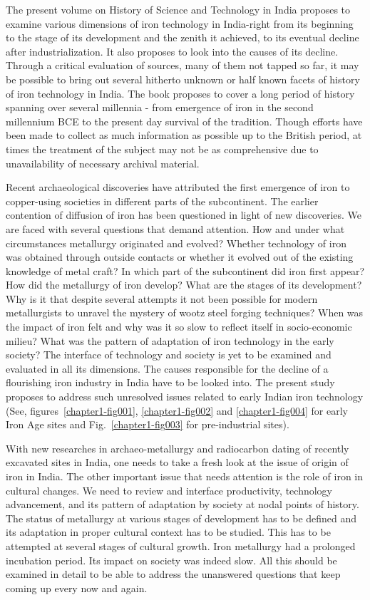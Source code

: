 The present volume on History of Science and Technology in India proposes to examine various dimensions of iron technology in India-right from its beginning to the stage of its development and the zenith it achieved, to its eventual decline after industrialization. It also proposes to look into the causes of its decline. Through a critical evaluation of sources, many of them not tapped so far, it may be possible to bring out several hitherto unknown or half known facets of history of iron technology in India. The book proposes to cover a long period of history spanning over several millennia - from emergence of iron in the second millennium BCE to the present day survival of the tradition. Though efforts have been made to collect as much information as possible up to the British period, at times the treatment of the subject may not be as comprehensive due to unavailability of necessary archival material.

Recent archaeological discoveries have attributed the first emergence of iron to copper-using societies in different parts of the subcontinent. The earlier contention of diffusion of iron has been questioned in light of new discoveries. We are faced with several questions that demand attention. How and under what circumstances metallurgy originated and evolved? Whether technology of iron was obtained through outside contacts or whether it evolved out of the existing knowledge of metal craft? In which part of the subcontinent did iron first appear? How did the metallurgy of iron develop? What are the stages of its development? Why is it that despite several attempts it not been possible for modern metallurgists to unravel the mystery of wootz steel forging techniques? When was the impact of iron felt and why was it so slow to reflect itself in socio-economic milieu? What was the pattern of adaptation of iron technology in the early society? The interface of technology and society is yet to be examined and evaluated in all its dimensions. The causes responsible for the decline of a flourishing iron industry in India have to be looked into. The present study proposes to address such unresolved issues related to early Indian iron technology (See, figures~{\ref{chapter1-fig001}}, \ref{chapter1-fig002} and \ref{chapter1-fig004} for early Iron Age sites and Fig.~\ref{chapter1-fig003} for pre-industrial sites). 

\newpage

With new researches in archaeo-metallurgy and radiocarbon dating of recently excavated sites in India, one needs to take a fresh look at the issue of origin of iron in India. The other important issue that needs attention is the role of iron in cultural changes. We need to review and interface productivity, technology advancement, and its pattern of adaptation by society at nodal points of history. The status of metallurgy at various stages of development has to be defined and its adaptation in proper cultural context has to be studied. This has to be attempted at several stages of cultural growth. Iron metallurgy had a prolonged incubation period. Its impact on society was indeed slow. All this should be examined in detail to be able to address the unanswered questions that keep coming up every now and again. 

